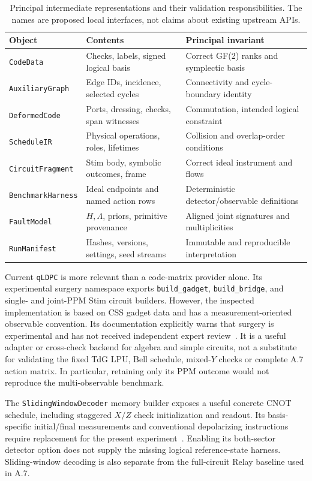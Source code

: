 \documentclass[11pt,a4paper]{article}
\begin{document}
\begin{table}[tb]
\caption{Principal intermediate representations and their validation responsibilities. The names are proposed local interfaces, not claims about existing upstream APIs.}
\label{tab:modules}
\small
\begin{tabularx}{\linewidth}{@{}p{34mm}YY@{}}
\toprule
Object & Contents & Principal invariant\\\midrule
\texttt{CodeData} & Checks, labels, signed logical basis & Correct GF(2) ranks and symplectic basis\\
\texttt{AuxiliaryGraph} & Edge IDs, incidence, selected cycles & Connectivity and cycle-boundary identity\\
\texttt{DeformedCode} & Ports, dressing, checks, span witnesses & Commutation, intended logical constraint\\
\texttt{ScheduleIR} & Physical operations, roles, lifetimes & Collision and overlap-order conditions\\
\texttt{CircuitFragment} & Stim body, symbolic outcomes, frame & Correct ideal instrument and flows\\
\texttt{BenchmarkHarness} & Ideal endpoints and named action rows & Deterministic detector/observable definitions\\
\texttt{FaultModel} & $H,\Lambda$, priors, primitive provenance & Aligned joint signatures and multiplicities\\
\texttt{RunManifest} & Hashes, versions, settings, seed streams & Immutable and reproducible interpretation\\\bottomrule
\end{tabularx}
\end{table}

Current \texttt{qLDPC} is more relevant than a code-matrix provider alone. Its experimental surgery namespace exports \texttt{build\_gadget}, \texttt{build\_bridge}, and single- and joint-PPM Stim circuit builders. However, the inspected implementation is based on CSS gadget data and has a measurement-oriented observable convention. Its documentation explicitly warns that surgery is experimental and has not received independent expert review~\cite{qldpc}. It is a useful adapter or cross-check backend for algebra and simple circuits, not a substitute for validating the fixed TdG LPU, Bell schedule, mixed-$Y$ checks or complete A.7 action matrix. In particular, retaining only its PPM outcome would not reproduce the multi-observable benchmark.

The \texttt{SlidingWindowDecoder} memory builder exposes a useful concrete CNOT schedule, including staggered $X/Z$ check initialization and readout. Its basis-specific initial/final measurements and conventional depolarizing instructions require replacement for the present experiment~\cite{swd}. Enabling its both-sector detector option does not supply the missing logical reference-state harness. Sliding-window decoding is also separate from the full-circuit Relay baseline used in A.7.
\end{document}
